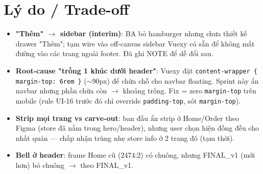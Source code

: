 \section{Lý do / Trade-off}

\begin{itemize}
  \item \textbf{"Thêm" \(\rightarrow\) sidebar (interim)}: BA bỏ hamburger nhưng
        chưa thiết kế drawer "Thêm"; tạm wire vào off-canvas sidebar Vuexy có sẵn
        để không mất đường vào các trang ngoài footer. Đã ghi NOTE để dễ đổi sau.
  \item \textbf{Root-cause "trống 1 khúc dưới header"}: Vuexy đặt
        \texttt{content-wrapper \{ margin-top: 6rem \}} (\(\sim\)90px) để chừa chỗ
        cho navbar floating. Sprint này ẩn navbar nhưng phần chừa còn \(\rightarrow\)
        khoảng trống. Fix = zero \texttt{margin-top} trên mobile (rule UI-16 trước
        đó chỉ override \texttt{padding-top}, sót \texttt{margin-top}).
  \item \textbf{Strip mọi trang vs carve-out}: ban đầu ẩn strip ở Home/Order theo
        Figma (store đã nằm trong hero/header), nhưng user chọn hiện đồng đều cho
        nhất quán --- chấp nhận trùng nhẹ store info ở 2 trang đó (tạm thời).
  \item \textbf{Bell ở header}: frame Home cũ (2474:2) có chuông, nhưng FINAL\_v1
        (mới hơn) bỏ chuông \(\rightarrow\) theo FINAL\_v1.
\end{itemize}

